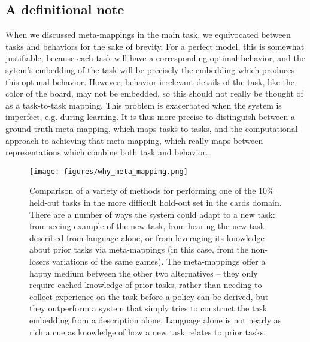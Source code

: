 \subsection{A definitional note}
When we discussed meta-mappings in the main task, we equivocated between tasks and behaviors for the sake of brevity. For a perfect model, this is somewhat justifiable, because each task will have a corresponding optimal behavior, and the sytem's embedding of the task will be precisely the embedding which produces this optimal behavior. However, behavior-irrelevant details of the task, like the color of the board, may not be embedded, so this should not really be thought of as a task-to-task mapping. This problem is exacerbated when the system is imperfect, e.g. during learning. It is thus more precise to distinguish between a ground-truth meta-mapping, which maps tasks to tasks, and the computational approach to achieving that meta-mapping, which really maps between representations which combine both task and behavior. \par
\begin{figure}[H]
\centering
\texttt{[image: figures/why\_meta\_mapping.png]}
\caption{Comparison of a variety of methods for performing one of the 10\% held-out tasks in the more difficult hold-out set in the cards domain. There are a number of ways the system could adapt to a new task: from seeing example of the new task, from hearing the new task described from language alone, or from leveraging its knowledge about prior tasks via meta-mappings (in this case, from the non-losers variations of the same games). The meta-mappings offer a happy medium between the other two alternatives -- they only require cached knowledge of prior tasks, rather than needing to collect experience on the task before a policy can be derived, but they outperform a system that simply tries to construct the task embedding from a description alone. Language alone is not nearly as rich a cue as knowledge of how a new task relates to prior tasks.} 
\label{fig_why_meta_mapping}
\end{figure}
